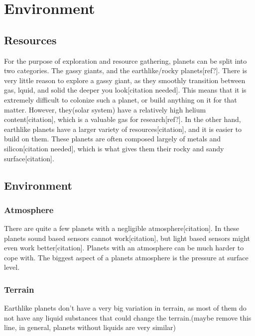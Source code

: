 %
%
%
%
%
\clearpage
\section{Environment}
\subsection{Resources}
For the purpose of exploration and resource gathering, planets can be split into two categories. The gassy giants, and the earthlike/rocky planets[ref?].
There is very little reason to explore a gassy giant, as they smoothly transition between gas, lquid, and solid the deeper you look[citation needed]. This means that it is extremely difficult to colonize such a planet, or build anything on it for that matter. However, they(solar system) have a relatively high helium content[citation], which is a valuable gas for research[ref?]. 
In the other hand, earthlike planets have a larger variety of resources[citation], and it is easier to build on them. These planets are often composed largely of metals and silicon[citation needed], which is what gives them their rocky and sandy surface[citation].


\subsection{Environment}
\subsubsection{Atmosphere}
There are quite a few planets with a negligible atmosphere[citation]. In these planets sound based sensors cannot work[citation], but light based sensors might even work better[citation].
Planets with an atmosphere can be much harder to cope with. The biggest aspect of a planets atmosphere is the pressure at surface level.

\subsubsection{Terrain}
Earthlike planets don't have a very big variation in terrain, as most of them do not have any liquid substances that could change the terrain.(maybe remove this line, in general, planets without liquids are very similar)


